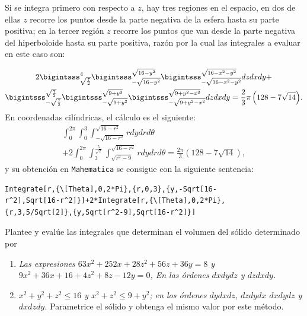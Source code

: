 %
Si se integra primero con respecto a $z$, hay tres regiones en el espacio, en dos de ellas $z$ recorre los puntos desde la parte negativa de la esfera hasta su parte positiva; en la tercer región $z$ recorre los puntos que van desde la parte negativa del hiperboloide hasta su parte positiva, razón por la cual las integrales a evaluar en este caso son:

\begin{multline*}
2\bi_{\sqrt{\frac{7}{2}}}^{4}\bi_{-\sqrt{16-y^2}}^{\sqrt{16-y^2}}\bi_{-\sqrt{16-x^2-y^2}}^{\sqrt{16-x^2-y^2}}dzdxdy+ \\
\bi_{-\sqrt{\frac{7}{2}}}^{\sqrt{\frac{7}{2}}}\bi_{-\sqrt{9+y^2}}^{\sqrt{9+y^2}}\bi_{-\sqrt{9+y^2-x^2}}^{\sqrt{9+y^2-x^2}}dzdxdy =\frac{2}{3}\pi\left( 128-7\sqrt{14}\right)\!.
\end{multline*}
En coordenadas cilíndricas, el cálculo es el siguiente:
\begin{multline*}
\int_{0}^{2\pi }\int_{0}^{3}\int_{-\sqrt{16-r^2}}^{\sqrt{16-r^2}}rdydrd\theta \\ +2\int_{0}^{2\pi}\int_{3}^{\frac{5}{\sqrt{2}}}\int_{\sqrt{r^2-9}}^{\sqrt{16-r^2}}rdydrd\theta = \frac{2\pi}{3}(128-7 \sqrt{14}),
\end{multline*}
y su obtención en \verb"Mahematica" se consigue con la siguiente sentencia:

\begin{tcolorbox}[title=\bf Instrucción en \verb"Mathematica"]\begin{Verbatim}[formatcom=\letraverbatim]
Integrate[r,{\[Theta],0,2*Pi},{r,0,3},{y,-Sqrt[16-
r^2],Sqrt[16-r^2]}]+2*Integrate[r,{\[Theta],0,2*Pi},
{r,3,5/Sqrt[2]},{y,Sqrt[r^2-9],Sqrt[16-r^2]}]
\end{Verbatim}
\end{tcolorbox}

\begin{ejer}
Plantee y evalúe las integrales que determinan el volumen del sólido determinado por
\begin{enumerate}
\item \textit{Las expresiones $63x^2+252x+28z^2+56z+36y=8$ y $9x^2+36x+16+4z^2+8z-12y=0$,
En las órdenes $dxdydz$ y $dzdxdy$.}
\item \textit{$x^2 + y^2 + z^2 \leq 16$ y $x^2 + z^2 \leq 9 + y^2$; en los órdenes $dydxdz$, $dzdydx$ $dxdydz$ y $dxdzdy$.}
Parametrice el sólido y obtenga el mismo valor por este método.
\end{enumerate}
\end{ejer}

